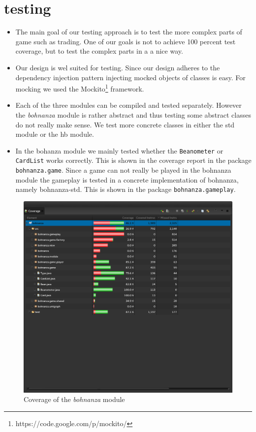 \section{testing}
\begin{itemize}
\item{The main goal of our testing approach is to test the more complex parts of game such as
trading. One of our goals is not to achieve 100 percent test coverage, but to test the complex parts
in a a nice way. }
    \item {
Our design is wel suited for testing. Since our design adheres to the dependency injection pattern
injecting mocked objects of classes is easy. For mocking we used the
Mockito\footnote{https://code.google.com/p/mockito/} framework.}
\item {Each of the three modules can be compiled and tested separately. However the \emph{bohnanza}
module is rather abstract and thus testing some abstract classes do not really make sense. We test
more concrete classes in either the \gls{std} module or the \gls{hb} module.}
\item {In the bohanza module we mainly tested whether the \texttt{Beanometer} or \texttt{CardList}
works correctly. This is shown in the coverage report in the package \texttt{bohnanza.game}. Since a
game can not really be played in the bohnanza module the gameplay is tested in a concrete
implementation of bohnanza, namely bohnanza-std. This is shown in the package
\texttt{bohnanza.gameplay}}.
\end{itemize}

\begin{figure}[h!]
    \includegraphics[width=\textwidth]{../img/coverage}
    \caption{Coverage of the \emph{bohnanza} module}
    \label{fig:test:coverage}
\end{figure}

